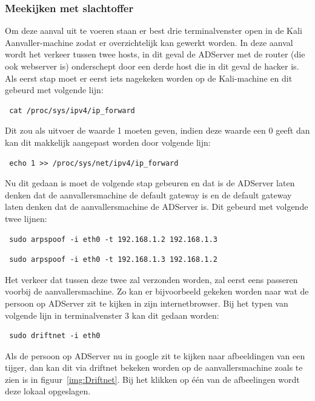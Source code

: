 \documentclass[pdftex,a4paper,12pt]{report}
\begin{document}
\subsubsection{Meekijken met slachtoffer}
Om deze aanval uit te voeren staan er best drie terminalvenster open in de Kali Aanvaller-machine zodat er overzichtelijk kan gewerkt worden. In deze aanval wordt het verkeer tussen twee hosts, in dit geval de ADServer met de router (die ook webserver is) onderschept door een derde host die in dit geval de hacker is. Als eerst stap moet er eerst iets nagekeken worden op de Kali-machine en dit gebeurd met volgende lijn:
\begin{verbatim} cat /proc/sys/ipv4/ip_forward \end{verbatim}
Dit zou als uitvoer de waarde 1 moeten geven, indien deze waarde een 0 geeft dan kan dit makkelijk aangepast worden door volgende lijn:
\begin{verbatim} echo 1 >> /proc/sys/net/ipv4/ip_forward \end{verbatim}
Nu dit gedaan is moet de volgende stap gebeuren en dat is de ADServer laten denken dat de aanvallersmachine de default gateway is en de default gateway laten denken dat de aanvallersmachine de ADServer is. Dit gebeurd met volgende twee lijnen:
\begin{verbatim} sudo arpspoof -i eth0 -t 192.168.1.2 192.168.1.3 \end{verbatim}
\begin{verbatim} sudo arpspoof -i eth0 -t 192.168.1.3 192.168.1.2 \end{verbatim}
Het verkeer dat tussen deze twee zal verzonden worden, zal eerst eens passeren voorbij de aanvallersmachine. Zo kan er bijvoorbeeld gekeken worden naar wat de persoon op ADServer zit te kijken in zijn internetbrowser. Bij het typen van volgende lijn in terminalvenster 3 kan dit gedaan worden: 
\begin{verbatim} sudo driftnet -i eth0 \end{verbatim}
Als de persoon op ADServer nu in google zit te kijken naar afbeeldingen van een tijger, dan kan dit via driftnet bekeken worden op de aanvallersmachine zoals te zien is in figuur~\ref{img:Driftnet}. Bij het klikken op één van de afbeelingen wordt deze lokaal opgeslagen. \citep{Walsh2013}
\end{document}
